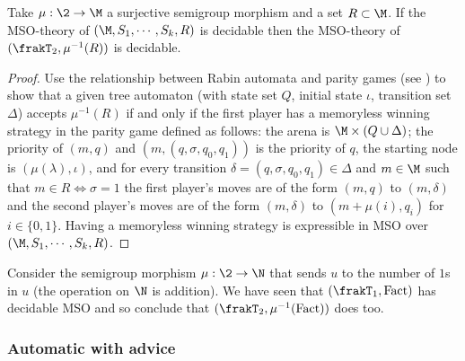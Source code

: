 \begin{theorem} \cite{Frat05}
Take $\mu:\2 \to \M$ a surjective semigroup morphism and a set
$R \subset \M$. If  the MSO-theory of $(\M,S_1,\cdots,S_k,R)$ is decidable then the MSO-theory of $(\frakT_2,\mu^{-1}(R))$ is decidable. 
\end{theorem}

\begin{proof}
Use the relationship between Rabin automata and parity games (see \cite{Thom90}) to show that a given tree automaton (with state set $Q$, initial state $\iota$, transition set $\Delta$) accepts $\mu^{-1}(R)$ if and only if the first player has a memoryless winning strategy in the parity game defined as follows: the arena is $\M \times (Q \cup \Delta)$; the priority of $(m,q)$ and $(m,(q,\sigma,q_0,q_1))$ is the priority of $q$, the starting node is $(\mu(\lambda),\iota)$, and for every transition $\delta = (q,\sigma,q_0,q_1) \in \Delta$ and $m \in \M$ such that $m \in R \iff \sigma = 1$ the first player's moves are of the form $(m,q)$ to $(m,\delta)$ and the second player's moves are of the form $(m,\delta)$ to $(m+\mu(i),q_{i})$ for $i \in \{0,1\}$. Having a memoryless winning strategy is expressible in MSO over $(\M,S_1,\cdots,S_k,R)$.
\end{proof}

\begin{example}
Consider the semigroup morphism  $\mu:\2 \to \N$ that sends
$u$ to the number of $1$s in $u$ (the operation on $\N$ is addition). We have seen that $(\frakT_1,\textrm{Fact})$ has decidable MSO and so conclude that
$(\frakT_2,\mu^{-1}(\textrm{Fact}))$ does too.
\end{example}


\subsubsection*{Automatic with advice}

